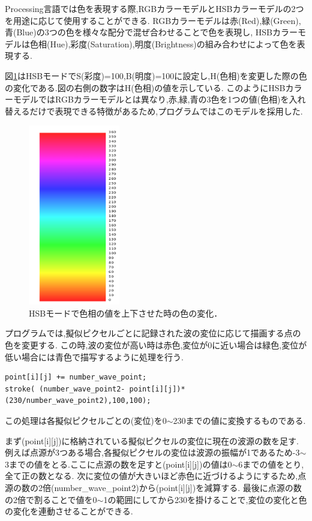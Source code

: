 Processing言語では色を表現する際,RGBカラーモデルとHSBカラーモデルの2つを用途に応じて使用することができる.
RGBカラーモデルは赤(Red),緑(Green),青(Blue)の3つの色を様々な配分で混ぜ合わせることで色を表現し,
HSBカラーモデルは色相(Hue),彩度(Saturation),明度(Brightness)の組み合わせによって色を表現する.

図\ref{fig:hsb}はHSBモードでS(彩度)=100,B(明度)=100に設定し,H(色相)を変更した際の色の変化である.図の右側の数字はH(色相)の値を示している.
このようにHSBカラーモデルではRGBカラーモデルとは異なり,赤,緑,青の3色を1つの値(色相)を入れ替えるだけで表現できる特徴があるため,プログラムではこのモデルを採用した.
\begin{figure}[H]
 \begin{center}
  \includegraphics[width=40mm]{../implement/hsb.png}
 \end{center}
 \caption{HSBモードで色相の値を上下させた時の色の変化．}
 \label{fig:hsb}
\end{figure}


プログラムでは,擬似ピクセルごとに記録された波の変位に応じて描画する点の色を変更する.
この時,波の変位が高い時は赤色,変位が0に近い場合は緑色,変位が低い場合には青色で描写するように処理を行う.
\begin{framed}
{\small
\begin{verbatim}
point[i][j] += number_wave_point;
stroke( (number_wave_point2- point[i][j])*(230/number_wave_point2),100,100);
\end{verbatim}}
\end{framed}
この処理は各擬似ピクセルごとの(変位)を0$\sim$230までの値に変換するものである.

まず(point[i][j])に格納されている擬似ピクセルの変位に現在の波源の数を足す.
例えば点源が3つある場合,各擬似ピクセルの変位は波源の振幅が1であるため-3$\sim$3までの値をとる.ここに点源の数を足すと(point[i][j])の値は0$\sim$6までの値をとり,全て正の数となる.
次に変位の値が大きいほど赤色に近づけるようにするため,点源の数の2倍(number\_wave\_point2)から(point[i][j])を減算する.
最後に点源の数の2倍で割ることで値を0$\sim$1の範囲にしてから230を掛けることで,変位の変化と色の変化を連動させることができる.

